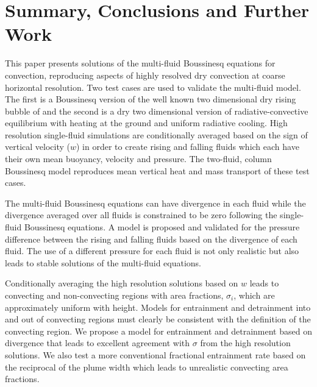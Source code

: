 \documentclass[draft]{agujournal2019}
\begin{document}
\section{Summary, Conclusions and Further Work}

This paper presents solutions of the multi-fluid Boussinesq equations
for convection, reproducing aspects of highly resolved dry convection
at coarse horizontal resolution. Two test cases are used to validate
the multi-fluid model. The first is a Boussinesq version of the well
known two dimensional dry rising bubble of  and the second
is a dry two dimensional version of radiative-convective equilibrium
with heating at the ground and uniform radiative cooling. High resolution
single-fluid simulations are conditionally averaged based on the sign
of vertical velocity ($w$) in order to create rising and falling
fluids which each have their own mean buoyancy, velocity and pressure.
The two-fluid,  column Boussinesq model reproduces mean vertical
heat and mass transport of these test cases. 

The multi-fluid Boussinesq equations can have divergence in each fluid
while the divergence averaged over all fluids is 
{constrained to be zero following the single-fluid Boussinesq equations.}
A model is proposed and validated for the pressure difference between the rising
and falling fluids based on the divergence of each fluid. The use
of a different pressure for each fluid is not only realistic but also
leads to stable solutions of the multi-fluid equations. 

Conditionally averaging the high resolution solutions based on $w$
leads to convecting and non-convecting regions with area fractions,
$\sigma_{i}$, which are approximately uniform with height. Models
for entrainment and detrainment into and out of convecting regions
must clearly be consistent with the definition of the convecting region.
We propose a model for entrainment and detrainment based on divergence
that leads to excellent agreement with $\sigma$ from the high resolution
solutions. We also test a more conventional fractional entrainment
rate based on the reciprocal of the plume width which leads to unrealistic
convecting area fractions. 
\end{document}
